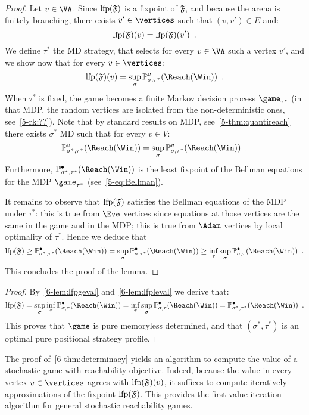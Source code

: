 \begin{proof}
Let $v \in \VA$. Since $\textrm{lfp}(\mathfrak{F})$ is a fixpoint of
$\mathfrak{F}$, and because the arena is finitely branching, there exists $v'\in \vertices$ such
that $(v,v') \in E$ and:
\[
\textrm{lfp}(\mathfrak{F})(v) = \textrm{lfp}(\mathfrak{F})(v') \enspace.
\]
We define $\tau^*$ the MD strategy, that selects for every
$v\in \VA$ such a vertex $v'$, and we show now that for every
$v \in \vertices$:
\[
\lfp(\mathfrak{F})(v) = \sup_\sigma
\probm_{\sigma,\tau^*}^v(\Reach(\Win)) \enspace.
\]
When $\tau^*$ is fixed, the game becomes a finite Markov decision
process $\game_{\tau^*}$ (in that MDP, the random vertices are
isolated from the non-deterministic ones, see~\cref{5-rk:??}). 
Note that by standard results on MDP,
see~\cref{5-thm:quantireach} there exists $\sigma^*$ MD such that
for every $v \in V$:
\[
\probm_{\sigma^*,\tau^*}^v(\Reach(\Win)) = \sup_\sigma
\probm_{\sigma,\tau^*}^v(\Reach(\Win)) \enspace.
\]
Furthermore, $\probm_{\sigma^*,\tau^*}^\bullet(\Reach(\Win))$ is
the least fixpoint of the Bellman equations for the MDP
$\game_{\tau^*}$ (see~\cref{5-eq:Bellman}).
  
It remains to observe that $\textrm{lfp}(\mathfrak{F})$ satisfies the
Bellman equations of the MDP under $\tau^*$: this is true from
$\Eve$ vertices since equations at those vertices are the same in
the game and in the MDP; this is true from $\Adam$ vertices by local
optimality of $\tau^*$. Hence we deduce that
\[
\lfp(\mathfrak{F}) \ge
\probm_{\sigma^*,\tau^*}^\bullet(\Reach(\Win)) = \sup_\sigma
\probm_{\sigma,\tau^*}^\bullet(\Reach(\Win)) \ge \inf_\tau
\sup_\sigma \probm_{\sigma,\tau}^\bullet(\Reach(\Win)) \enspace.
\]
This concludes the proof of the lemma. 
\end{proof}

\begin{proof}
By~\cref{6-lem:lfpgeval} and~\cref{6-lem:lfpleval}  we derive that:
\[
\lfp(\mathfrak{F}) =
\sup_\sigma \inf_\tau 
\probm_{\sigma,\tau}^\bullet(\Reach(\Win)) =  \inf_\tau \sup_\sigma
\probm_{\sigma,\tau}^\bullet(\Reach(\Win)) = 
\probm_{\sigma^*,\tau^*}^\bullet(\Reach(\Win)) \enspace.
\]
This proves that $\game$ is pure memoryless determined, and that
$(\sigma^*,\tau^*)$ is an optimal pure positional strategy profile.
\end{proof}

The proof of~\cref{6-thm:determinacy} yields an algorithm to
compute the value of a stochastic game with reachability
objective. Indeed, because the value in every vertex $v \in \vertices$
agrees with $\textrm{lfp}(\mathfrak{F})(v)$, it suffices to compute
iteratively approximations of the fixpoint $\textrm{lfp}(\mathfrak{F})$.  This
provides the first value iteration algorithm for general stochastic
reachability games.

